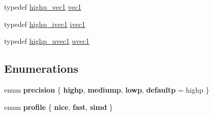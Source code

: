 \begin{DoxyCompactItemize}
\item 
typedef \hyperlink{group__gtc__type__precision_gab3f08c031846e7a95b49e81c48d920d3}{highp\+\_\+vec1} \hyperlink{namespaceglm_a16030dae9029ed1eab1553a2183bbb79}{vec1}
\item 
typedef \hyperlink{namespaceglm_addb6724b01f125e2730aeaad6130b06f}{highp\+\_\+ivec1} \hyperlink{namespaceglm_a946031cea0c22745848ebd873e6facb0}{ivec1}
\item 
typedef \hyperlink{namespaceglm_a2a480125ab05aa522d883651ea1101f8}{highp\+\_\+uvec1} \hyperlink{namespaceglm_a4e12bc23a3d060164eef452f81d92a03}{uvec1}
\end{DoxyCompactItemize}
\subsection*{Enumerations}
\begin{DoxyCompactItemize}
\item 
enum {\bfseries precision} \{ {\bfseries highp}, 
{\bfseries mediump}, 
{\bfseries lowp}, 
{\bfseries defaultp} = highp
 \}\hypertarget{namespaceglm_a0f04f086094c747d227af4425893f545}{}\label{namespaceglm_a0f04f086094c747d227af4425893f545}

\item 
enum {\bfseries profile} \{ {\bfseries nice}, 
{\bfseries fast}, 
{\bfseries simd}
 \}\hypertarget{namespaceglm_a33617ea243a270b94b41bd15f2016c20}{}\label{namespaceglm_a33617ea243a270b94b41bd15f2016c20}

\end{DoxyCompactItemize}
